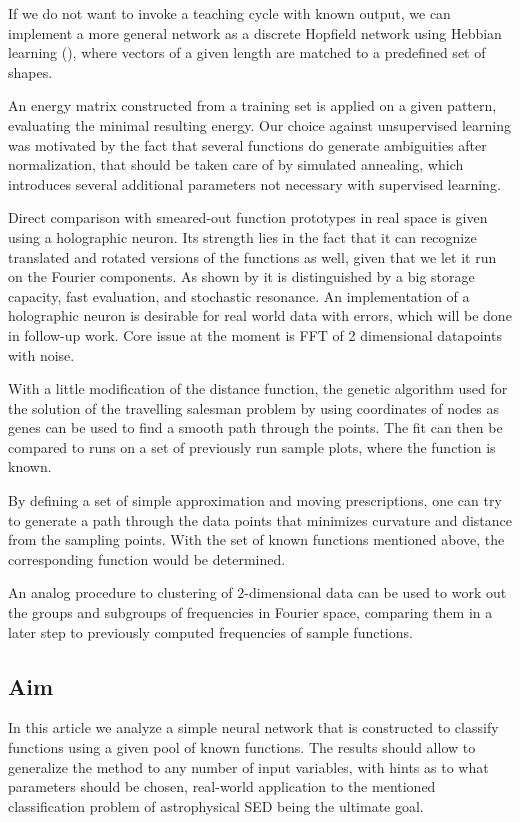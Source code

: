 \documentclass[useAMS,usenatbib]{templates/mn2e}
\begin{document}
If we do not want to invoke a teaching cycle with known output, we can
implement a more general network as a discrete Hopfield network using
Hebbian learning (\cite{Hopfield1982}), where vectors of a given
length are matched to a predefined set of shapes.

An energy matrix constructed from a training set is applied on a given
pattern, evaluating the minimal resulting energy. Our choice against
unsupervised learning was motivated by the fact that several functions
do generate ambiguities after normalization, that should be taken care
of by simulated annealing, which introduces several additional
parameters not necessary with supervised learning.

Direct comparison with smeared-out function prototypes in real space
is given using a holographic neuron. Its strength lies in the fact
that it can recognize translated and rotated versions of the functions
as well, given that we let it run on the Fourier components. As shown
by \cite{Stoop2003} it is distinguished by a big storage capacity, fast
evaluation, and stochastic resonance. An implementation of a
holographic neuron is desirable for real world data with errors, which
will be done in follow-up work. Core issue at the moment is FFT of 2
dimensional datapoints with noise.

With a little modification of the distance function, the genetic
algorithm used for the solution of the travelling salesman problem by
using coordinates of nodes as genes can be used to find a smooth path
through the points. The fit can then be compared to runs on a set of
previously run sample plots, where the function is known.

By defining a set of simple approximation and moving prescriptions,
one can try to generate a path through the data points that minimizes
curvature and distance from the sampling points. With the set of known
functions mentioned above, the corresponding function would be
determined.

An analog procedure to clustering of $2$-dimensional data can be used
to work out the groups and subgroups of frequencies in Fourier space,
comparing them in a later step to previously computed frequencies of
sample functions.

\subsection{Aim}
In this article we analyze a simple neural network that is constructed
to classify functions using a given pool of known functions. The
results should allow to generalize the method to any number of input
variables, with hints as to what parameters should be chosen,
real-world application to the mentioned classification problem of
astrophysical SED being the ultimate goal.
\end{document}
